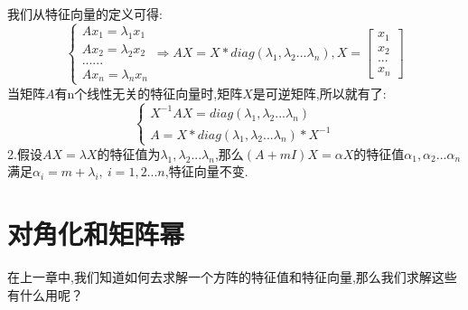 \documentclass[oneside]{book}
\begin{document}
	我们从特征向量的定义可得:
	$$\left\{\begin{array}{c}
		Ax_{1}=\lambda_{1}x_{1}\\Ax_{2}=\lambda_{2}x_{2}\\......\\Ax_{n}=\lambda_{n}x_{n}
	\end{array}\right.\Rightarrow AX=X*diag(\lambda_{1},\lambda_{2}...\lambda_{n}),X=\left[\begin{array}{cccc}
	x_{1}\\x_{2}\\...\\x_{n}
\end{array}\right]$$
当矩阵$A$有n个线性无关的特征向量时,矩阵$X$是可逆矩阵,所以就有了:
$$\left\{\begin{array}{c}
	X^{-1}AX=diag(\lambda_{1},\lambda_{2}...\lambda_{n})\\A=X*diag(\lambda_{1},\lambda_{2}...\lambda_{n})*X^{-1}
\end{array}\right.$$
	2.假设$AX=\lambda X$的特征值为$\lambda_{1},\lambda_{2}...\lambda_{n}$,那么$(A+mI)X=\alpha X$的特征值$\alpha_{1},\alpha_{2}...\alpha_{n}$满足$\alpha_{i}=m+\lambda_{i},\ i=1,2...n$,特征向量不变.
	\chapter{对角化和矩阵幂}
	在上一章中,我们知道如何去求解一个方阵的特征值和特征向量,那么我们求解这些有什么用呢？
	
\end{document}
